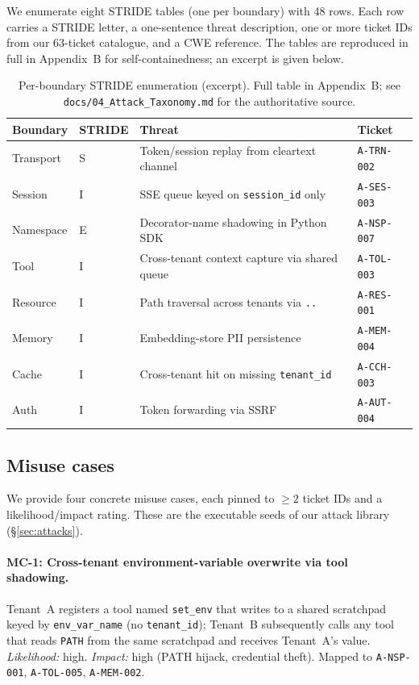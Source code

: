 We enumerate eight STRIDE tables (one per boundary) with 48
rows. Each row carries a STRIDE letter, a one-sentence threat
description, one or more ticket IDs from our 63-ticket
catalogue, and a CWE reference. The tables are reproduced in
full in Appendix~B for self-containedness; an excerpt is given
below.

\begin{table}[t]
\caption{Per-boundary STRIDE enumeration (excerpt). Full table in
Appendix~B; see \texttt{docs/04\_Attack\_Taxonomy.md} for the
authoritative source.}
\label{tab:stride-excerpt}
\centering
\small
\begin{tabularx}{\linewidth}{l l X l}
\toprule
Boundary & STRIDE & Threat & Ticket \\
\midrule
Transport & S & Token/session replay from cleartext channel & \texttt{A-TRN-002} \\
Session   & I & SSE queue keyed on \texttt{session\_id} only     & \texttt{A-SES-003} \\
Namespace & E & Decorator-name shadowing in Python SDK         & \texttt{A-NSP-007} \\
Tool      & I & Cross-tenant context capture via shared queue   & \texttt{A-TOL-003} \\
Resource  & I & Path traversal across tenants via \texttt{..}   & \texttt{A-RES-001} \\
Memory    & I & Embedding-store PII persistence                 & \texttt{A-MEM-004} \\
Cache     & I & Cross-tenant hit on missing \texttt{tenant\_id} & \texttt{A-CCH-003} \\
Auth      & I & Token forwarding via SSRF                      & \texttt{A-AUT-004} \\
\bottomrule
\end{tabularx}
\end{table}

\subsection{Misuse cases}

We provide four concrete misuse cases, each pinned to $\geq 2$
ticket IDs and a likelihood/impact rating. These are the
executable seeds of our attack library
(\S\ref{sec:attacks}).

\paragraph{MC-1: Cross-tenant environment-variable overwrite via
tool shadowing.} Tenant~A registers a tool named
\texttt{set\_env} that writes to a shared scratchpad keyed by
\texttt{env\_var\_name} (no \texttt{tenant\_id}); Tenant~B
subsequently calls any tool that reads \texttt{PATH} from the
same scratchpad and receives Tenant~A's value. \emph{Likelihood:}
high. \emph{Impact:} high (PATH hijack, credential theft).
Mapped to \texttt{A-NSP-001}, \texttt{A-TOL-005},
\texttt{A-MEM-002}.


